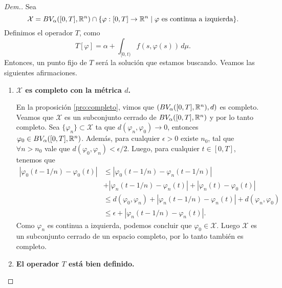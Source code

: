 \begin{proof}[Dem.] %
Sea $$\mathcal{X}=BV_\alpha([0,T],\mathbb{R}^n)\cap \{\varphi:[0,T]\to \mathbb{R}^n \mid \varphi \text{ es continua a izquierda}\}.$$
Definimos el operador $T$, como 
\begin{equation}\label{eq:T}
    T[\varphi]= \alpha + \int_{[0,t)}f(s,\varphi(s))\, d\mu.
\end{equation}
Entonces, un punto fijo de $T$ será la solución que estamos buscando. Veamos las siguientes afirmaciones.

\begin{enumerate}
    \item
    \textbf{$\mathcal{X}$ es completo con la métrica $d$.} 
    
    En la proposición \ref{pro:completo}, vimos que $(BV_\alpha([0,T],\mathbb{R}^n),d)$ es completo. Veamos que $\mathcal{X}$ es un subconjunto cerrado de $BV_\alpha([0,T],\mathbb{R}^n)$ y por lo tanto completo. Sea $\{\varphi_n\}\subset \mathcal{X}$ ta que $d(\varphi_n, \varphi_0) \to 0$, entonces $\varphi_0\in BV_\alpha([0,T],\mathbb{R}^n)$. Además, para cualquier $\epsilon>0$  existe $n_0$, tal que $\forall n>n_0$ vale que $d(\varphi_0,\varphi_n)<\epsilon/2$. Luego, para cualquier $t\in[0,T]$, tenemos que
    \begin{equation*}
        \begin{split}
            |\varphi_0(t-1/n)-\varphi_0(t)|&\leq 
            |\varphi_0(t-1/n)-\varphi_n(t-1/n)|\\&+|\varphi_n(t-1/n)-\varphi_n(t)|+|\varphi_n(t)-\varphi_0(t)|\\
            &\leq d(\varphi_0,\varphi_n)+|\varphi_n(t-1/n)-\varphi_n(t)|+d(\varphi_n,\varphi_0)\\
            &\leq \epsilon +|\varphi_n(t-1/n)-\varphi_n(t)|.
        \end{split}
    \end{equation*}
Como $\varphi_n$ es continua a izquierda, podemos concluir que $\varphi_0\in \mathcal{X}$. Luego $\mathcal{X}$ es un subconjunto cerrado de un espacio completo, por lo tanto también es completo.

\item  \textbf{El operador $T$ está bien definido.}


\end{enumerate}
\end{proof}
